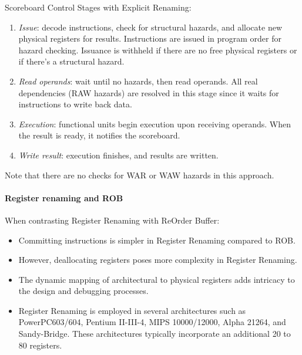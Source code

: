 Scoreboard Control Stages with Explicit Renaming:
\begin{enumerate}
    \item \textit{Issue}: decode instructions, check for structural hazards, and allocate new physical registers for results. Instructions are issued in program order for hazard checking. Issuance is withheld if there are no free physical registers or if there's a structural hazard.
    \item \textit{Read operands}: wait until no hazards, then read operands. All real dependencies (RAW hazards) are resolved in this stage since it waits for instructions to write back data.
    \item \textit{Execution}: functional units begin execution upon receiving operands. When the result is ready, it notifies the scoreboard.
    \item \textit{Write result}: execution finishes, and results are written.
\end{enumerate}
Note that there are no checks for WAR or WAW hazards in this approach.

\paragraph*{Register renaming and ROB}
When contrasting Register Renaming with ReOrder Buffer:
\begin{itemize}
    \item Committing instructions is simpler in Register Renaming compared to ROB.
    \item However, deallocating registers poses more complexity in Register Renaming.
    \item The dynamic mapping of architectural to physical registers adds intricacy to the design and debugging processes.
    \item Register Renaming is employed in several architectures such as PowerPC603/604, Pentium II-III-4, MIPS 10000/12000, Alpha 21264, and Sandy-Bridge. 
        These architectures typically incorporate an additional 20 to 80 registers.
\end{itemize}

